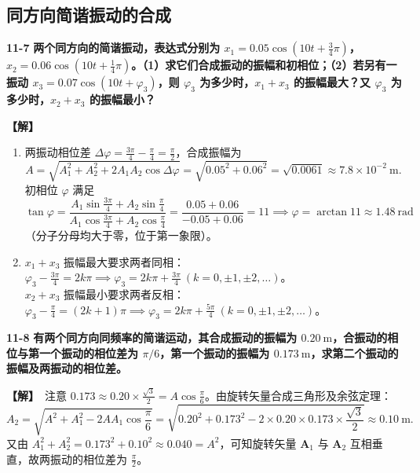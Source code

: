 \documentclass[zihao=5,a4paper,UTF8]{ctexart}
\newenvironment{prob}[2]{%
    \par\vspace{6pt}\noindent\textbf{\color{navy}#1} \textbf{#2}\par\nopagebreak\vspace{2pt}%
}{%
    \par\vspace{4pt}%
}
\newcommand{\sol}{\noindent\textbf{\color{tealaccent}【解】}\ }
\newcommand{\vect}[1]{\bm{#1}}
\begin{document}
\subsection{同方向简谐振动的合成}

\begin{prob}{11-7}{两个同方向的简谐振动，表达式分别为 $x_1 = 0.05\cos\left(10t + \frac{3}{4}\pi\right)$，$x_2 = 0.06\cos\left(10t + \frac{1}{4}\pi\right)$。（1）求它们合成振动的振幅和初相位；（2）若另有一振动 $x_3 = 0.07\cos(10t + \varphi_3)$，则 $\varphi_3$ 为多少时，$x_1+x_3$ 的振幅最大？又 $\varphi_3$ 为多少时，$x_2+x_3$ 的振幅最小？}
\sol
\begin{enumerate}[leftmargin=2em, itemsep=2pt]
    \item 两振动相位差 $\Delta\varphi = \frac{3\pi}{4} - \frac{\pi}{4} = \frac{\pi}{2}$，合成振幅为
    \[
        A = \sqrt{A_1^2 + A_2^2 + 2A_1A_2\cos\Delta\varphi} = \sqrt{0.05^2 + 0.06^2} = \sqrt{0.0061} \approx 7.8\times 10^{-2}\ \mathrm{m}.
    \]
    初相位 $\varphi$ 满足
    \[
        \tan\varphi = \frac{A_1\sin\frac{3\pi}{4} + A_2\sin\frac{\pi}{4}}{A_1\cos\frac{3\pi}{4} + A_2\cos\frac{\pi}{4}} = \frac{0.05 + 0.06}{-0.05 + 0.06} = 11 \implies \varphi = \arctan 11 \approx 1.48\ \mathrm{rad}
    \]
    （分子分母均大于零，位于第一象限）。
    \item $x_1 + x_3$ 振幅最大要求两者同相：$\varphi_3 - \frac{3\pi}{4} = 2k\pi \implies \varphi_3 = 2k\pi + \frac{3\pi}{4}\ (k=0,\pm 1,\pm 2,\dots)$。\\
    $x_2 + x_3$ 振幅最小要求两者反相：$\varphi_3 - \frac{\pi}{4} = (2k+1)\pi \implies \varphi_3 = 2k\pi + \frac{5\pi}{4}\ (k=0,\pm 1,\pm 2,\dots)$。
\end{enumerate}
\end{prob}

\begin{prob}{11-8}{有两个同方向同频率的简谐运动，其合成振动的振幅为 $0.20\ \mathrm{m}$，合振动的相位与第一个振动的相位差为 $\pi/6$，第一个振动的振幅为 $0.173\ \mathrm{m}$，求第二个振动的振幅及两振动的相位差。}
\sol 注意 $0.173 \approx 0.20\times\frac{\sqrt{3}}{2} = A\cos\frac{\pi}{6}$。由旋转矢量合成三角形及余弦定理：
\[
    A_2 = \sqrt{A^2 + A_1^2 - 2AA_1\cos\frac{\pi}{6}} = \sqrt{0.20^2 + 0.173^2 - 2\times 0.20\times 0.173\times\frac{\sqrt{3}}{2}} \approx 0.10\ \mathrm{m}.
\]
又由 $A_1^2 + A_2^2 = 0.173^2 + 0.10^2 \approx 0.040 = A^2$，可知旋转矢量 $\vect{A}_1$ 与 $\vect{A}_2$ 互相垂直，故两振动的相位差为 $\frac{\pi}{2}$。
\end{prob}
\end{document}
